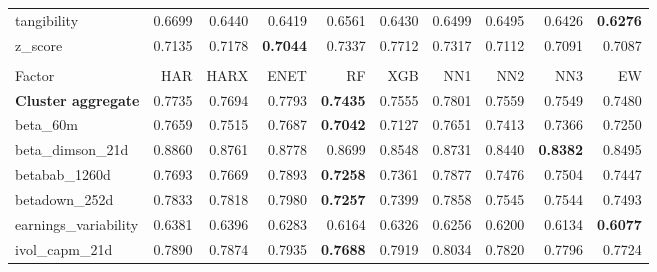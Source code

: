\begin{longtable}{>{\raggedright\arraybackslash}p{2.6cm}rrrrrrrrr}
tangibility & 0.6699 & \cellcolor{blue!10}0.6440 & \cellcolor{blue!10}0.6419 & \cellcolor{blue!10}0.6561 & \cellcolor{blue!10}0.6430 & \cellcolor{blue!10}0.6499 & \cellcolor{blue!10}0.6495 & \cellcolor{blue!10}0.6426 & \textbf{\cellcolor{blue!10}0.6276} \\
z\_score & 0.7135 & 0.7178 & \textbf{\cellcolor{blue!10}0.7044} & 0.7337 & 0.7712 & 0.7317 & \cellcolor{blue!10}0.7112 & \cellcolor{blue!10}0.7091 & \cellcolor{blue!10}0.7087 \\
\hline
\multicolumn{10}{@{}l}{\textit{Panel E. Low Risk}} \\
\hline
Factor & HAR & HARX & ENET & RF & XGB & NN1 & NN2 & NN3 & EW \\
\hline
\textbf{Cluster aggregate} & 0.7735 & \cellcolor{blue!10}0.7694 & 0.7793 & \textbf{\cellcolor{blue!10}0.7435} & \cellcolor{blue!10}0.7555 & 0.7801 & \cellcolor{blue!10}0.7559 & \cellcolor{blue!10}0.7549 & \cellcolor{blue!10}0.7480 \\
beta\_60m & 0.7659 & \cellcolor{blue!10}0.7515 & 0.7687 & \textbf{\cellcolor{blue!10}0.7042} & \cellcolor{blue!10}0.7127 & \cellcolor{blue!10}0.7651 & \cellcolor{blue!10}0.7413 & \cellcolor{blue!10}0.7366 & \cellcolor{blue!10}0.7250 \\
beta\_dimson\_21d & 0.8860 & \cellcolor{blue!10}0.8761 & \cellcolor{blue!10}0.8778 & \cellcolor{blue!10}0.8699 & \cellcolor{blue!10}0.8548 & \cellcolor{blue!10}0.8731 & \cellcolor{blue!10}0.8440 & \textbf{\cellcolor{blue!10}0.8382} & \cellcolor{blue!10}0.8495 \\
betabab\_1260d & 0.7693 & \cellcolor{blue!10}0.7669 & 0.7893 & \textbf{\cellcolor{blue!10}0.7258} & \cellcolor{blue!10}0.7361 & 0.7877 & \cellcolor{blue!10}0.7476 & \cellcolor{blue!10}0.7504 & \cellcolor{blue!10}0.7447 \\
betadown\_252d & 0.7833 & \cellcolor{blue!10}0.7818 & 0.7980 & \textbf{\cellcolor{blue!10}0.7257} & \cellcolor{blue!10}0.7399 & 0.7858 & \cellcolor{blue!10}0.7545 & \cellcolor{blue!10}0.7544 & \cellcolor{blue!10}0.7493 \\
earnings\_variability & 0.6381 & 0.6396 & \cellcolor{blue!10}0.6283 & \cellcolor{blue!10}0.6164 & \cellcolor{blue!10}0.6326 & \cellcolor{blue!10}0.6256 & \cellcolor{blue!10}0.6200 & \cellcolor{blue!10}0.6134 & \textbf{\cellcolor{blue!10}0.6077} \\
ivol\_capm\_21d & 0.7890 & \cellcolor{blue!10}0.7874 & 0.7935 & \textbf{\cellcolor{blue!10}0.7688} & 0.7919 & 0.8034 & \cellcolor{blue!10}0.7820 & \cellcolor{blue!10}0.7796 & \cellcolor{blue!10}0.7724 \\

\end{longtable}
